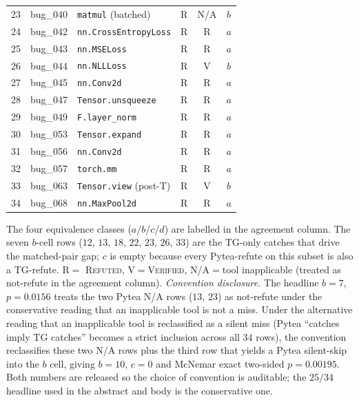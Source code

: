 \begin{table}[h]
\begin{tabular}{r l l c c c}
23 & bug\_040 & \texttt{matmul} (batched) & R & N/A & $b$ \\
24 & bug\_042 & \texttt{nn.CrossEntropyLoss} & R & R & $a$ \\
25 & bug\_043 & \texttt{nn.MSELoss} & R & R & $a$ \\
26 & bug\_044 & \texttt{nn.NLLLoss} & R & V & $b$ \\
27 & bug\_045 & \texttt{nn.Conv2d} & R & R & $a$ \\
28 & bug\_047 & \texttt{Tensor.unsqueeze} & R & R & $a$ \\
29 & bug\_049 & \texttt{F.layer\_norm} & R & R & $a$ \\
30 & bug\_053 & \texttt{Tensor.expand} & R & R & $a$ \\
31 & bug\_056 & \texttt{nn.Conv2d} & R & R & $a$ \\
32 & bug\_057 & \texttt{torch.mm} & R & R & $a$ \\
33 & bug\_063 & \texttt{Tensor.view} (post-T) & R & V & $b$ \\
34 & bug\_068 & \texttt{nn.MaxPool2d} & R & R & $a$ \\
\bottomrule
\end{tabular}
\end{table}

The four equivalence classes ($a$/$b$/$c$/$d$) are
labelled in the agreement column. The seven $b$-cell rows
($12$, $13$, $18$, $22$, $23$, $26$, $33$) are the TG-only
catches that drive the matched-pair gap; $c$ is empty because
every Pytea-refute on this subset is also a TG-refute. R$=$
\textsc{Refuted}, V$=$\textsc{Verified}, N/A$=$tool inapplicable
(treated as not-refute in the agreement column).
\emph{Convention disclosure.} The headline $b{=}7$, $p{=}0.0156$
treats the two Pytea N/A rows ($13$, $23$) as not-refute under
the conservative reading that an inapplicable tool is not a
miss. Under the alternative reading that an inapplicable tool
is reclassified as a silent miss (Pytea ``catches imply
TG catches'' becomes a strict inclusion across all $34$
rows), the convention reclassifies these two N/A rows plus
the third row that yields a Pytea silent-skip into the $b$
cell, giving $b{=}10$, $c{=}0$ and McNemar exact two-sided
$p{=}0.00195$. Both numbers are released so the choice of
convention is auditable; the $25/34$ headline used in the
abstract and body is the conservative one.

